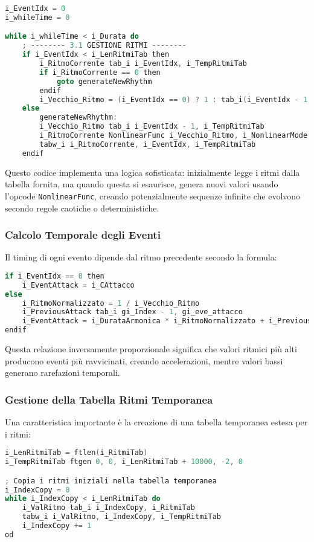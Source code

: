 \begin{lstlisting}[language=C]
i_EventIdx = 0
i_whileTime = 0

while i_whileTime < i_Durata do
    ; -------- 3.1 GESTIONE RITMI --------
    if i_EventIdx < i_LenRitmiTab then
        i_RitmoCorrente tab_i i_EventIdx, i_TempRitmiTab
        if i_RitmoCorrente == 0 then
            goto generateNewRhythm
        endif
        i_Vecchio_Ritmo = (i_EventIdx == 0) ? 1 : tab_i(i_EventIdx - 1, i_TempRitmiTab)
    else
        generateNewRhythm:
        i_Vecchio_Ritmo tab_i i_EventIdx - 1, i_TempRitmiTab
        i_RitmoCorrente NonlinearFunc i_Vecchio_Ritmo, i_NonlinearMode
        tabw_i i_RitmoCorrente, i_EventIdx, i_TempRitmiTab
    endif
\end{lstlisting}

Questo codice implementa una logica sofisticata: inizialmente legge i ritmi dalla tabella fornita, ma quando questa si esaurisce, genera nuovi valori usando l'opcode \texttt{NonlinearFunc}, creando potenzialmente sequenze infinite che evolvono secondo regole caotiche o deterministiche.
\subsubsection{Calcolo Temporale degli Eventi}
Il timing di ogni evento dipende dal ritmo precedente secondo la formula:

\begin{lstlisting}[language=C]
if i_EventIdx == 0 then
    i_EventAttack = i_CAttacco
else
    i_RitmoNormalizzato = 1 / i_Vecchio_Ritmo
    i_PreviousAttack tab_i gi_Index - 1, gi_eve_attacco
    i_EventAttack = i_DurataArmonica * i_RitmoNormalizzato + i_PreviousAttack
endif
\end{lstlisting}

Questa relazione inversamente proporzionale significa che valori ritmici più alti producono eventi più ravvicinati, creando accelerazioni, mentre valori bassi generano rarefazioni temporali.
\subsubsection{Gestione della Tabella Ritmi Temporanea}
Una caratteristica importante è la creazione di una tabella temporanea estesa per i ritmi:

\begin{lstlisting}[language=C]
i_LenRitmiTab = ftlen(i_RitmiTab)
i_TempRitmiTab ftgen 0, 0, i_LenRitmiTab + 10000, -2, 0

; Copia i ritmi iniziali nella tabella temporanea
i_IndexCopy = 0
while i_IndexCopy < i_LenRitmiTab do
    i_ValRitmo tab_i i_IndexCopy, i_RitmiTab
    tabw_i i_ValRitmo, i_IndexCopy, i_TempRitmiTab
    i_IndexCopy += 1
od
\end{lstlisting}

